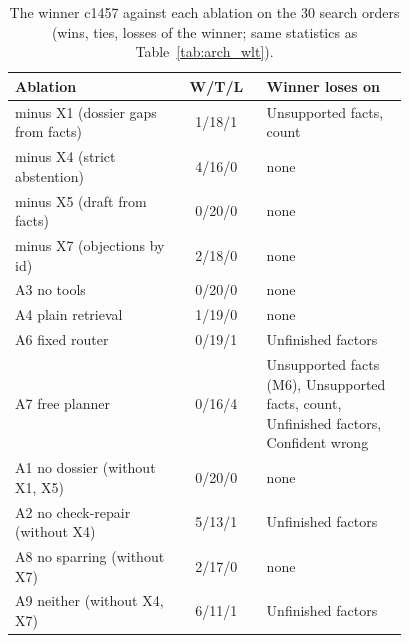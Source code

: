 \begin{table}[!t]
\centering\small
\begin{tabular}{@{}>{\raggedright\arraybackslash}p{0.42\linewidth}c>{\raggedright\arraybackslash}p{0.36\linewidth}@{}}
\toprule
Ablation & W/T/L & Winner loses on \\
\midrule
minus X1 (dossier gaps from facts) & 1/18/1 & Unsupported facts, count \\
minus X4 (strict abstention) & 4/16/0 & none \\
minus X5 (draft from facts) & 0/20/0 & none \\
minus X7 (objections by id) & 2/18/0 & none \\
A3 no tools & 0/20/0 & none \\
A4 plain retrieval & 1/19/0 & none \\
A6 fixed router & 0/19/1 & Unfinished factors \\
A7 free planner & 0/16/4 & Unsupported facts (M6), Unsupported facts, count, Unfinished factors, Confident wrong \\
A1 no dossier (without X1, X5) & 0/20/0 & none \\
A2 no check-repair (without X4) & 5/13/1 & Unfinished factors \\
A8 no sparring (without X7) & 2/17/0 & none \\
A9 neither (without X4, X7) & 6/11/1 & Unfinished factors \\
\bottomrule
\end{tabular}
\caption{The winner c1457 against each ablation on the 30 search orders (wins, ties, losses of the winner; same statistics as Table~\ref{tab:arch_wlt}).}
\label{tab:arch_ablate}
\end{table}
